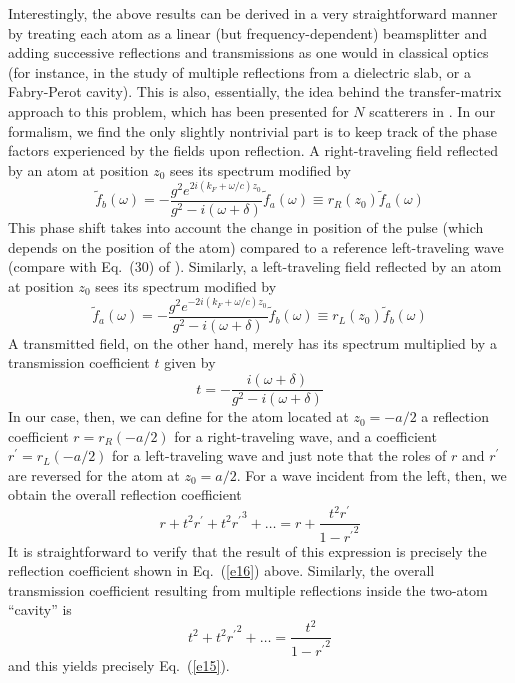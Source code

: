 \documentclass[aps,pra,twocolumn,floatfix,superscriptaddress]{revtex4}
\begin{document}
Interestingly, the above results can be derived in a very straightforward manner by treating each atom as a linear (but frequency-dependent) beamsplitter and adding successive reflections and transmissions as one would in classical optics (for instance, in the study of multiple reflections from a dielectric slab, or a Fabry-Perot cavity).  This is also, essentially, the idea behind the transfer-matrix approach to this problem, which has been presented for $N$ scatterers in \cite{shen2,tsoilaw}.    In our formalism, we find the only slightly nontrivial part is to keep track of the phase factors experienced by the fields upon reflection.  A right-traveling field reflected by an atom at position $z_0$ sees its spectrum modified by 
\begin{equation}
\tilde f_b(\omega) = -\frac{g^2 e^{2i(k_F+\omega/c)z_0}}{g^2-i(\omega+\delta)}\tilde f_a(\omega) \equiv r_R(z_0)\tilde f_a(\omega)
\label{e17}
\end{equation}
This phase shift takes into account the change in position of the pulse (which depends on the position of the atom) compared to a reference left-traveling wave (compare with Eq.~(30) of \cite{zubairy1}).  Similarly, a left-traveling field reflected by an atom at position $z_0$ sees its spectrum modified by 
\begin{equation}
\tilde f_a(\omega)  = -\frac{g^2 e^{-2i(k_F+\omega/c)z_0}}{g^2-i(\omega+\delta)}\tilde f_b(\omega)  \equiv r_L(z_0)\tilde f_b(\omega) 
\label{e18}
\end{equation}
A transmitted field, on the other hand, merely has its spectrum multiplied by a transmission coefficient $t$ given by 
\begin{equation}
t = -\frac{i(\omega+\delta)}{g^2-i(\omega+\delta)}
\label{e19}
\end{equation}
In our case, then, we can define for the atom located at $z_0 = -a/2$ a reflection coefficient $r= r_R(-a/2)$ for a right-traveling wave, and a coefficient $r^\prime = r_L(-a/2)$ for a left-traveling wave and just note that the roles of $r$ and $r^\prime$ are reversed for the atom at $z_0 = a/2$.  For a wave incident from the left, then, we obtain the overall reflection coefficient
\begin{equation}
r+t^2 r^\prime + t^2{r^\prime}^3 + \ldots = r + \frac{t^2 r^\prime}{1-{r^\prime}^2}
\label{e20}
\end{equation}
It is straightforward to verify that the result of this expression is precisely the reflection coefficient shown in Eq.~(\ref{e16}) above.  Similarly, the overall transmission coefficient resulting from multiple reflections inside the two-atom ``cavity'' is
\begin{equation}
t^2 + t^2 {r^\prime}^2 + \ldots =  \frac{t^2}{1-{r^\prime}^2}
\label{e21}
\end{equation}
and this yields precisely Eq.~(\ref{e15}).
\end{document}
